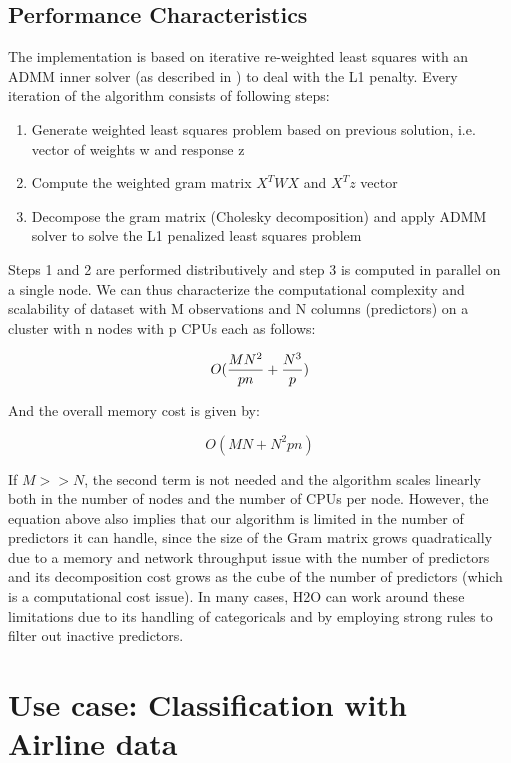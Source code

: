 \subsection{Performance Characteristics}
The implementation is based on iterative re-weighted least squares with an ADMM inner solver (as described in ) to deal with the L1 penalty. Every iteration of the algorithm consists of following steps:
\begin{enumerate} 
\item Generate weighted least squares problem based on previous solution, i.e. vector of weights w and response z 
\item Compute the weighted gram matrix $X^TWX$ and $X^Tz$ vector
\item Decompose the gram matrix (Cholesky decomposition) and apply ADMM solver to solve the L1 penalized least squares problem
\end{enumerate}

Steps 1 and 2 are performed distributively and step 3 is computed in parallel on a single node. We can thus characterize the computational complexity and scalability of dataset with M observations and N columns (predictors) on a cluster with n nodes with p CPUs each as follows:

\[ O({MN^2 \over pn} + {N^3 \over p})\]

And the overall memory cost is given by:

\[ O(MN + N^2pn)\]

If $M >> N$, the second term is not needed and the algorithm scales linearly both in the number of nodes and the number of CPUs per node. However, the equation above also implies that our algorithm is limited in the number of predictors it can handle, since the size of the Gram matrix grows quadratically due to a memory and network throughput issue with the number of predictors and its decomposition cost grows as the cube of the number of predictors (which is a computational cost issue). In many cases, H2O can work around these limitations due to its handling of categoricals and by employing strong rules to filter out inactive predictors.  


\section{Use case: Classification with Airline data}

